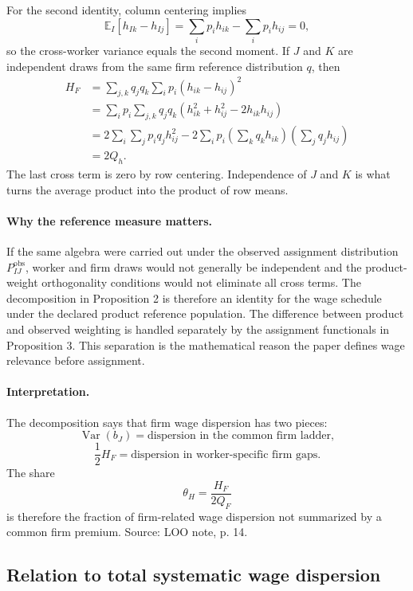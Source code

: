 \documentclass[11pt]{article}
\newcommand{\E}{\mathbb{E}}
\newcommand{\Var}{\operatorname{Var}}
\begin{document}
For the second identity, column centering implies
\[
\E_I[h_{Ik}-h_{Ij}]
=\sum_i p_i h_{ik}-\sum_i p_i h_{ij}=0,
\]
so the cross-worker variance equals the second moment.  If \(J\) and \(K\)
are independent draws from the same firm reference distribution \(q\), then
\begin{align*}
H_F
&=\sum_{j,k}q_jq_k\sum_i p_i(h_{ik}-h_{ij})^2\\
&=\sum_i p_i\sum_{j,k}q_jq_k
\left(h_{ik}^2+h_{ij}^2-2h_{ik}h_{ij}\right)\\
&=2\sum_i\sum_jp_iq_jh_{ij}^2
-2\sum_i p_i
\left(\sum_kq_kh_{ik}\right)
\left(\sum_jq_jh_{ij}\right)\\
&=2Q_h.
\end{align*}
The last cross term is zero by row centering.  Independence of \(J\) and \(K\)
is what turns the average product into the product of row means.

\paragraph{Why the reference measure matters.}
If the same algebra were carried out under the observed assignment distribution
\(P_{IJ}^{\mathrm{obs}}\), worker and firm draws would not generally be
independent and the product-weight orthogonality conditions would not eliminate
all cross terms.  The decomposition in Proposition 2 is therefore an identity
for the wage schedule under the declared product reference population.  The
difference between product and observed weighting is handled separately by the
assignment functionals in Proposition 3.  This separation is the mathematical
reason the paper defines wage relevance before assignment.

\paragraph{Interpretation.}
The decomposition says that firm wage dispersion has two pieces:
\[
\Var(b_J)=\text{dispersion in the common firm ladder},
\]
\[
\frac{1}{2}H_F=\text{dispersion in worker-specific firm gaps}.
\]
The share
\[
\theta_H=\frac{H_F}{2Q_F}
\]
is therefore the fraction of firm-related wage dispersion not summarized by a
common firm premium. Source: LOO note, p. 14.

\subsection{Relation to total systematic wage dispersion}
\end{document}
